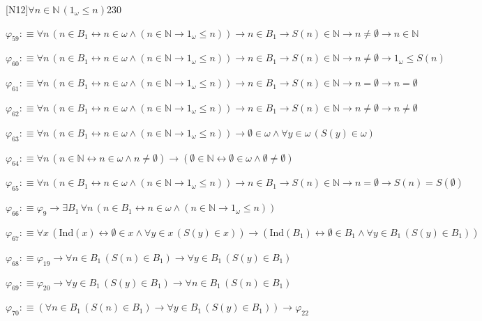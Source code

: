 \begin{fullproof}{[N12]}{$\forall n \in \mathbb{N}\,(1_{\omega} \leq n)$}{230}
\begin{abbrevlist}
\item $\varphi_{59} :\equiv \forall n\,(n \in B_{1} \leftrightarrow n \in \omega \land (n \in \mathbb{N} \to 1_{\omega} \leq n)) \to n \in B_{1} \to S(n) \in \mathbb{N} \to n \neq \emptyset \to n \in \mathbb{N}$
\item $\varphi_{60} :\equiv \forall n\,(n \in B_{1} \leftrightarrow n \in \omega \land (n \in \mathbb{N} \to 1_{\omega} \leq n)) \to n \in B_{1} \to S(n) \in \mathbb{N} \to n \neq \emptyset \to 1_{\omega} \leq S(n)$
\item $\varphi_{61} :\equiv \forall n\,(n \in B_{1} \leftrightarrow n \in \omega \land (n \in \mathbb{N} \to 1_{\omega} \leq n)) \to n \in B_{1} \to S(n) \in \mathbb{N} \to n = \emptyset \to n = \emptyset$
\item $\varphi_{62} :\equiv \forall n\,(n \in B_{1} \leftrightarrow n \in \omega \land (n \in \mathbb{N} \to 1_{\omega} \leq n)) \to n \in B_{1} \to S(n) \in \mathbb{N} \to n \neq \emptyset \to n \neq \emptyset$
\item $\varphi_{63} :\equiv \forall n\,(n \in B_{1} \leftrightarrow n \in \omega \land (n \in \mathbb{N} \to 1_{\omega} \leq n)) \to \emptyset \in \omega \land \forall y \in \omega\,(S(y) \in \omega)$
\item $\varphi_{64} :\equiv \forall n\,(n \in \mathbb{N} \leftrightarrow n \in \omega \land n \neq \emptyset) \to (\emptyset \in \mathbb{N} \leftrightarrow \emptyset \in \omega \land \emptyset \neq \emptyset)$
\item $\varphi_{65} :\equiv \forall n\,(n \in B_{1} \leftrightarrow n \in \omega \land (n \in \mathbb{N} \to 1_{\omega} \leq n)) \to n \in B_{1} \to S(n) \in \mathbb{N} \to n = \emptyset \to S(n) = S(\emptyset)$
\item $\varphi_{66} :\equiv \varphi_{9} \to \exists B_{1}\,\forall n\,(n \in B_{1} \leftrightarrow n \in \omega \land (n \in \mathbb{N} \to 1_{\omega} \leq n))$
\item $\varphi_{67} :\equiv \forall x\,(\mathrm{Ind}(x) \leftrightarrow \emptyset \in x \land \forall y \in x\,(S(y) \in x)) \to (\mathrm{Ind}(B_{1}) \leftrightarrow \emptyset \in B_{1} \land \forall y \in B_{1}\,(S(y) \in B_{1}))$
\item $\varphi_{68} :\equiv \varphi_{19} \to \forall n \in B_{1}\,(S(n) \in B_{1}) \to \forall y \in B_{1}\,(S(y) \in B_{1})$
\item $\varphi_{69} :\equiv \varphi_{20} \to \forall y \in B_{1}\,(S(y) \in B_{1}) \to \forall n \in B_{1}\,(S(n) \in B_{1})$
\item $\varphi_{70} :\equiv (\forall n \in B_{1}\,(S(n) \in B_{1}) \to \forall y \in B_{1}\,(S(y) \in B_{1})) \to \varphi_{22}$

\end{abbrevlist}
\end{fullproof}

